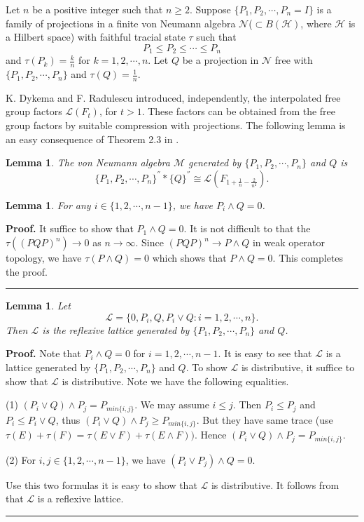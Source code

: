 \documentclass[12pt]{article}
\newtheorem{lemma}[theorem]{Lemma}
\newenvironment{proof}[1][Proof]{\textbf{#1.} }{\ \rule{0.5em}{0.5em}}
\def\H{{\mathscr{H} }}\def\L{{\mathscr{L}}}
\def\M{{\mathscr{ M}}}
\def\NN{{\mathscr{ N}}}
\begin{document}
Let $n$ be a positive integer such that $n\geq 2$. Suppose $\{P_1, P_2, \cdots, P_n=I\}$ is a family of projections in a finite von Neumann algebra $\NN$($\subset B(\H)$, where $\H$ is a Hilbert space) with faithful tracial state $\tau$ such that $$P_1\leq P_2\leq \cdots\leq P_n$$ and $\tau(P_k)=\frac{k}{n}$ for $k=1, 2, \cdots, n$. Let $Q$ be a projection in $\NN$ free with $\{P_1, P_2, \cdots, P_n\}$ and $\tau(Q)=\frac{1}{n}$. \newline

K. Dykema \cite{D2} and F. Radulescu \cite{R} introduced, independently, the interpolated
free group factors $\mathscr{L}(F_t)$, for $t>1$. These factors can be obtained
from the free group factors by suitable compression with projections.
The following lemma is an easy consequence of Theorem 2.3 in \cite{D1}.\newline

\begin{lemma} The von Neumann algebra $\M$ generated by $\{P_1, P_2, \cdots, P_n\}$ and $Q$ is
$$\{P_1, P_2, \cdots, P_n\}^{''}\ast \{Q\}^{''}\cong \mathscr{L}(F_{1+\frac{1}{n}-\frac{2}{n^2}}).$$
\end{lemma}


\begin{lemma} For any $i\in \{1, 2, \cdots, n-1\}$, we have $P_i\wedge Q=0$.\end{lemma}

\noindent\begin{proof} It suffice to show that $P_1\wedge Q=0$. It is not difficult to  that the $\tau((PQP)^n)\rightarrow 0$ as $n\rightarrow \infty$. Since $(PQP)^n\rightarrow P\wedge Q$ in weak operator topology, we have $\tau(P\wedge Q)=0$ which shows that $P\wedge Q=0$. This completes the proof. \end{proof}\newline

\begin{lemma} Let $$\L=\{0, P_i, Q, P_i\vee Q: i=1, 2, \cdots, n\}.$$ Then $\L$ is the reflexive lattice   generated by $\{P_1, P_2, \cdots, P_n\}$ and $Q$.\end{lemma}

\noindent\begin{proof}  Note that $P_i\wedge Q=0$ for  $i=1, 2, \cdots, n-1$. It is easy to see that  $\L$ is a lattice generated by $\{P_1, P_2, \cdots, P_n\}$ and $Q$. To show $\L$ is distributive, it suffice to show that
$\L$ is distributive. Note we have the following equalities.

(1) $(P_i\vee Q)\wedge P_j=P_{min\{i, j\}}$. We may assume $i\leq j$. Then $P_i\leq P_j$ and $P_i\leq P_i\vee Q$, thus $(P_i\vee Q)\wedge P_j\geq P_{min\{i, j\}}$. But they have same trace (use $\tau(E)+\tau(F)=\tau(E\vee F)+\tau(E\wedge F))$. Hence $(P_i\vee Q)\wedge P_j=P_{min\{i, j\}}$.

(2) For $i, j\in \{1, 2, \cdots, n-1\}$, we have $(P_i\vee P_j)\wedge Q=0$. 

Use this two formulas it is easy to show that $\L$ is distributive. It follows from \cite{Ha} that $\L$  is a reflexive lattice.
\end{proof}\newline
\end{document}
